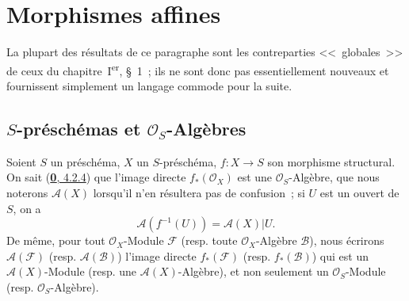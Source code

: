 \setcounter{section}{0}
\section{Morphismes affines}
\label{section:II.1-fr}

La plupart des résultats de ce paragraphe sont les contreparties
<<~globales~>> de ceux du chapitre~I\textsuperscript{er}, \S~1~; ils ne sont
donc pas essentiellement nouveaux et fournissent simplement un langage
commode pour la suite.

\setcounter{subsection}{0}
\subsection{$S$-préschémas et $\mathcal{O}_S$-Algèbres}
\label{subsection:II.1.1-fr}

\begin{env}[1.1.1]
\label{II.1.1.1-fr}
Soient $S$ un préschéma, $X$ un $S$-préschéma, $f:X\to S$ son morphisme
structural. On sait (\hyperref[0.4.2.4-fr]{\textbf{0}, 4.2.4}) que l'image directe
$f_*(\mathcal{O}_X)$ est une $\mathcal{O}_S$-Algèbre, que nous
noterons $\mathcal{A}(X)$ lorsqu'il n'en résultera pas de confusion~; si $U$
est un ouvert de $S$, on a
\[
  \mathcal{A}(f^{-1}(U))=\mathcal{A}(X)|U.
\]
De même, pour tout $\mathcal{O}_X$-Module $\mathcal{F}$ (resp. toute
$\mathcal{O}_X$-Algèbre $\mathcal{B}$), nous écrirons
$\mathcal{A}(\mathcal{F})$ (resp. $\mathcal{A}(\mathcal{B})$) l'image directe
$f_*(\mathcal{F})$ (resp. $f_*(\mathcal{B})$) qui est un
$\mathcal{A}(X)$-Module (resp. une $\mathcal{A}(X)$-Algèbre), et non seulement
un $\mathcal{O}_S$-Module (resp. $\mathcal{O}_S$-Algèbre).
\end{env}

